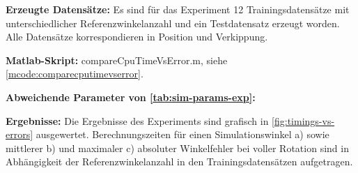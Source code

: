 \textbf{Erzeugte Datensätze:} Es sind für das Experiment 12 Trainingsdatensätze mit unterschiedlicher Referenzwinkelanzahl und ein Testdatensatz erzeugt worden. Alle Datensätze korrespondieren in Position und Verkippung.

\textbf{Matlab-Skript:} compareCpuTimeVsError.m, siehe \autoref{mcode:comparecputimevserror}.


\clearpage


\textbf{Abweichende Parameter von \autoref{tab:sim-params-exp}:}

\vspace{5mm}
\begin{table}[htp]
	\centering
	\caption{Abweichende Simulationsparameter im Experiment zur Referenzwinkelanpassung.}
	\label{tab:params-exp2}
\end{table}


\textbf{Ergebnisse:} Die Ergebnisse des Experiments sind grafisch in \autoref{fig:timings-vs-errors} ausgewertet. Berechnungszeiten für einen Simulationswinkel a) sowie mittlerer b) und maximaler c) absoluter Winkelfehler bei voller Rotation sind in Abhängigkeit der Referenzwinkelanzahl in den Trainingsdatensätzen aufgetragen.


